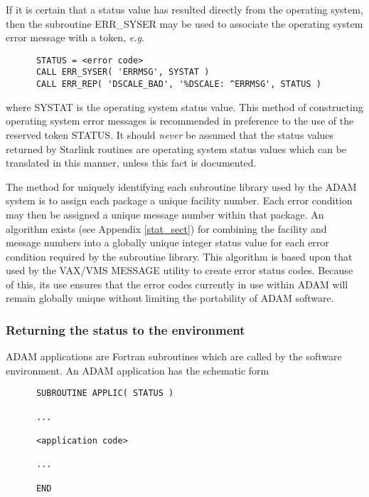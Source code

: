 If it is certain that a status value has resulted directly from the operating
system, then the subroutine ERR\_SYSER may be used to associate the operating 
system error message with a token, {\em e.g.}

\begin {small}
\begin{verbatim}
      STATUS = <error code>
      CALL ERR_SYSER( 'ERRMSG', SYSTAT )
      CALL ERR_REP( 'DSCALE_BAD', '%DSCALE: ^ERRMSG', STATUS )
\end{verbatim}
\end {small}

where SYSTAT is the operating system status value.
This method of constructing operating system error messages is recommended in
preference to the use of the reserved token STATUS. 
It should {\em never} be assumed that the status values returned by Starlink
routines are operating system status values which can be translated in this
manner, unless this fact is documented. 

The method for uniquely identifying each subroutine library used by the ADAM
system is to assign each package a unique facility number. 
Each error condition may then be assigned a unique message number within that
package.
An algorithm exists (see Appendix \ref{stat_sect}) for combining the facility
and message numbers into a globally unique integer status value for each error 
condition required by the subroutine library.
This algorithm is based upon that used by the VAX/VMS MESSAGE utility to create
error status codes. 
Because of this, its use ensures that the error codes currently in use within
ADAM will remain globally unique without limiting the portability of ADAM
software.


\subsubsection {Returning the status to the environment}

ADAM applications are Fortran subroutines which are called by the software
environment. 
An ADAM application has the schematic form 

\begin {small}
\begin{verbatim}
      SUBROUTINE APPLIC( STATUS )

      ...

      <application code>

      ...

      END
\end{verbatim}
\end {small}

